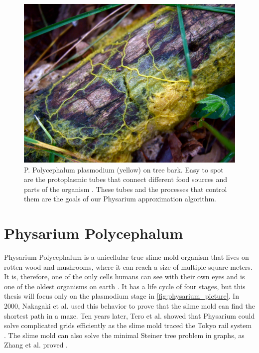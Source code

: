 \begin{figure}[H]
    \centering
    \includegraphics[width=0.75\linewidth]{figures/Physarum_polycephalum_plasmodium.jpg}
    \caption{P. Polycephalum plasmodium (yellow) on tree bark. Easy to spot are the protoplasmic tubes that connect different food sources and parts of the organism \cite{physarium_picture}. These tubes and the processes that control them are the goals of our Physarium approximation algorithm.}
    \label{fig:physarium_picture}
\end{figure}

\section{Physarium Polycephalum}
\label{sec:polycephalum}

Physarium Polycephalum is a unicellular true slime mold organism that lives on rotten wood and mushrooms, where it can reach a size of multiple square meters. It is, therefore, one of the only cells humans can see with their own eyes and is one of the oldest organisms on earth \cite{jabr_how_2012}. It has a life cycle of four stages, but this thesis will focus only on the plasmodium stage in \autoref{fig:physarium_picture}. In 2000, Nakagaki et al. \cite{nakagaki_maze-solving_2000, nakagaki_path_2001} used this behavior to prove that the slime mold can find the shortest path in a maze. Ten years later, Tero et al. showed that Physarium could solve complicated grids efficiently as the slime mold traced the Tokyo rail system \cite{tero_rules_2010}. The slime mold can also solve the minimal Steiner tree problem in graphs, as Zhang et al. proved \cite{zhang_improved_2014}.

